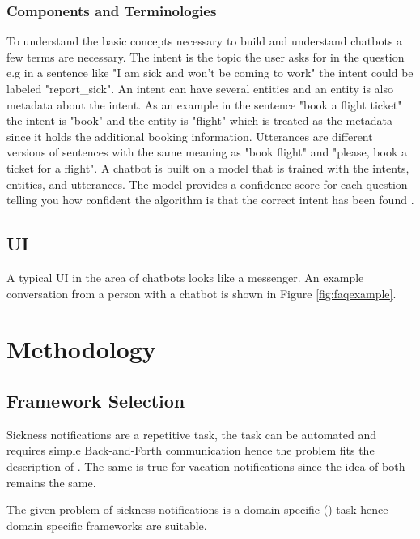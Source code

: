 \documentclass[12pt, backref]{report}
\begin{document}
\subsection{Components and Terminologies}
To understand the basic concepts necessary to build and understand chatbots a few terms are necessary. The intent is the topic the user asks for in the question e.g in a sentence like "I am sick and won't be coming to work" the intent could be labeled "report\_sick". 
An intent can have several entities and an entity is also metadata about the intent. As an example in the sentence "book a flight ticket" the intent is "book" and the entity is "flight" which is treated as the metadata since it holds the additional booking information.
Utterances are different versions of sentences with the same meaning as "book flight" and "please, book a ticket for a flight".
A chatbot is built on a model that is trained with the intents, entities, and utterances. 
The model provides a confidence score for each question telling you how confident the algorithm is that the correct intent has been found \cite{buiildChatbotsPython}.



\section{UI}
A typical UI in the area of chatbots looks like a messenger. An example conversation from a person with a chatbot is shown in Figure \ref{fig:faqexample}.



\chapter{Methodology}

\section{Framework Selection}
Sickness notifications are a repetitive task, the task can be automated and requires simple Back-and-Forth communication hence the problem fits the description of \citet{buiildChatbotsPython}.
The same is true for vacation notifications since the idea of both remains the same.

The given problem of sickness notifications is a domain specific (\citet{deshpande2017survey, luis2015williams, braunEvaluatingNLU, williams2017hybrid}) task hence domain specific frameworks are suitable.
\end{document}
